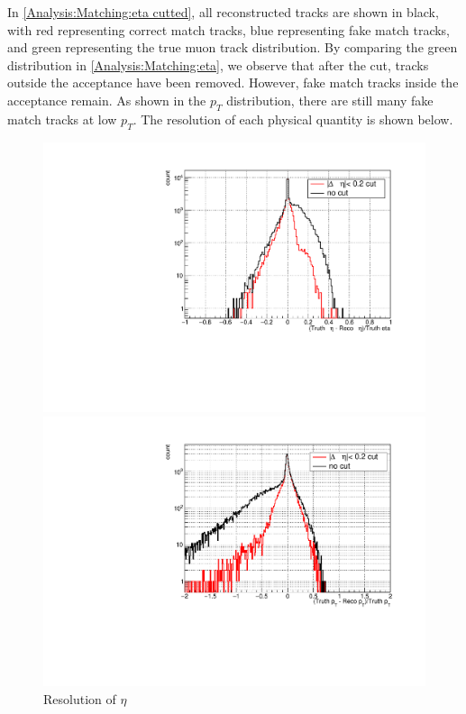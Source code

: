                 In \ref{Analysis:Matching:eta cutted}, all reconstructed tracks are shown in black, with red representing correct match tracks, blue representing fake match tracks, and green representing the true muon track distribution. By comparing the green distribution in \ref{Analysis:Matching:eta}, we observe that after the cut, tracks outside the acceptance have been removed. However, fake match tracks inside the acceptance remain. As shown in the $p_T$ distribution, there are still many fake match tracks at low $p_T$.\@
                The resolution of each physical quantity is shown below.
                \begin{figure}[H]
                    \centering
                        \begin{minipage}{0.45\textwidth}
                            \centering
                            \includegraphics[width=\textwidth]{fig/3_5_6_reso_eta.pdf} 
                            \caption{Resolution of $\eta$}
                            \label{Analysis:Matching:pt resolution}
                        \end{minipage}
                        \begin{minipage}{0.45\textwidth}
                            \centering
                            \includegraphics[width=\textwidth]{fig/3_5_6_reso_pt.pdf} 

\end{minipage}
\end{figure}
